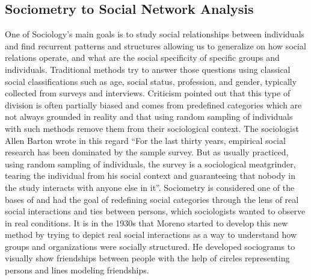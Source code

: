 \subsection{Sociometry to Social Network Analysis}

One of Sociology's main goals is to study social relationships between individuals and find recurrent patterns and structures allowing us to generalize on how social relations operate, and what are the social specificity of specific groups and individuals\cite{scottSocialNetworkAnalysis1988}.
Traditional methods try to answer those questions using classical social classifications such as age, social status, profession, and gender, typically collected from surveys and interviews.
Criticism pointed out that this type of division is often partially biased and comes from predefined categories which are not always grounded in reality\cite{freemanDevelopmentSocialNetwork2004} and that using random sampling of individuals with such methods remove them from their sociological context.
The sociologist Allen Barton wrote in this regard ``For the last thirty years, empirical social research has been dominated by the sample survey. But as usually practiced, using random sampling of individuals, the survey is a sociological meatgrinder, tearing the individual from his social context and guaranteeing that nobody in the study interacts with anyone else in it''\cite{bartonSurveyResearchMacroMethodology1968}.
Sociometry is considered one of the bases of \sna and had the goal of redefining social categories through the lens of real social interactions and ties between persons, which sociologists wanted to observe in real conditions.
It is in the 1930s that Moreno started to develop this new method by trying to depict real social interactions as a way to understand how groups and organizations were socially structured\cite{morenoFoundationsSociometryIntroduction1941}.
He developed sociograms to visually show friendships between people with the help of circles representing persons and lines modeling friendships.
